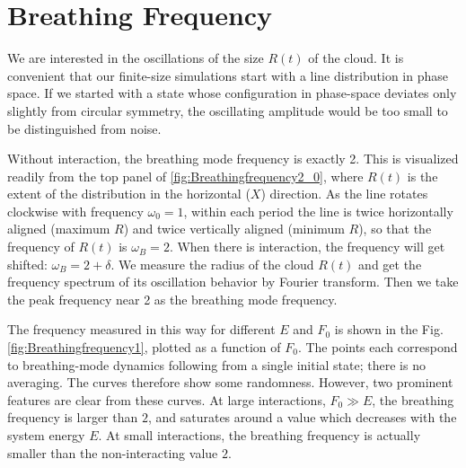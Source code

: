 \documentclass[aps,preprintnumbers,onecolumn,amsmath,amssymb,floatfix,pra]{revtex4-1}
\begin{document}
\section{Breathing Frequency}\label{section:breathing frequency}


We are interested in the oscillations of the size $R(t)$ of the cloud.  It is convenient that our
finite-size simulations start with a line distribution in phase space.  If we started with a state
whose configuration in phase-space deviates only slightly from circular symmetry, the oscillating
amplitude would be too small to be distinguished from noise.

Without interaction, the breathing mode frequency is exactly 2.  This is visualized readily from the
top panel of \ref{fig:Breathingfrequency2_0}, where $R(t)$ is the extent of the distribution in the
horizontal ($X$) direction.  As the line rotates clockwise with frequency $\omega_0=1$, within each
period the line is twice horizontally aligned (maximum $R$) and twice vertically aligned (minimum
$R$), so that the frequency of $R(t)$ is $\omega_B=2$.  When there is interaction, the frequency
will get shifted: $\omega_B = 2+\delta$.  We measure the radius of the cloud $R(t)$ and get the
frequency spectrum of its oscillation behavior by Fourier transform. Then we take the peak frequency
near 2 as the breathing mode frequency.

The frequency measured in this way for different $E$ and $F_0$ is shown in the
Fig.\ref{fig:Breathingfrequency1}, plotted as a function of $F_0$.  The points each correspond to
breathing-mode dynamics following from a single initial state; there is no averaging.  The curves
therefore show some randomness.  However, two prominent features are clear from these curves.  At
large interactions, $F_0\gg E$, the breathing frequency is larger than $2$, and saturates around a
value which decreases with the system energy $E$.  At small interactions, the breathing frequency is
actually smaller than the non-interacting value $2$.   
\end{document}

